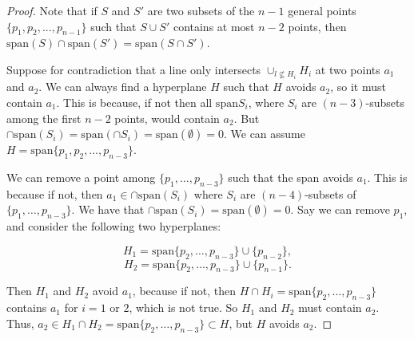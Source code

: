 \documentclass{amsart}
\theoremstyle{definition}
\theoremstyle{remark}
\begin{document}
\begin{proof}

Note that if $S$ and $S'$ are two subsets of the $n-1$ general points $\{p_1,p_2,...,p_{n-1}\}$ such that $S\cup S'$ contains at most $n-2$ points, then $\text{span}(S)\cap \mathrm{span}(S') = \mathrm{span}{(S\cap S')}$.

Suppose for contradiction that a line only intersects $\cup_{l \not\subseteq H_i} H_i$ at two points $a_1$ and $a_2$. We can always find a hyperplane $H$ such that $H$ avoids $a_2$, so it must contain $a_1$. This is because, if not then all $\mathrm{span}{S_i}$, where $S_i$ are $(n-3)$-subsets among the first $n-2$ points, would contain $a_2$. But $\cap \mathrm{span}(S_i) = \mathrm{span}(\cap S_i) = \mathrm{span}(\emptyset) = 0$. We can assume $H = \mathrm{span}\{p_1, p_2, \dots, p_{n-3}\}$.

We can remove a point among $\{p_1, \dots, p_{n-3}\}$ such that the span avoids $a_1$. This is because if not, then $a_1 \in \cap \mathrm{span}(S_i)$ where $S_i$ are $(n-4)$-subsets of $\{p_1, \dots, p_{n-3}\}$. We have that $\cap \mathrm{span}(S_i) = \mathrm{span}(\emptyset) = 0$. Say we can remove $p_1$, and consider the following two hyperplanes:

\[
H_1 = \mathrm{span}\{p_2, \dots, p_{n-3}\} \cup \{p_{n-2}\},
\]
\[
H_2 = \mathrm{span}\{p_2, \dots, p_{n-3}\} \cup \{p_{n-1}\}.
\]

Then $H_1$ and $H_2$ avoid $a_1$, because if not, then $H \cap H_i = \mathrm{span}\{p_2, \dots, p_{n-3}\}$ contains $a_1$ for $i=1\text{ or }2$, which is not true. So $H_1$ and $H_2$ must contain $a_2$. Thus, $a_2 \in H_1 \cap H_2 = \mathrm{span}\{p_2, \dots, p_{n-3}\} \subset H$, but $H$ avoids $a_2$.
\end{proof}
\end{document}
